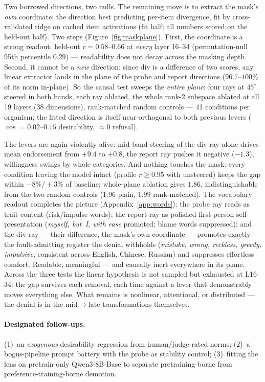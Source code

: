 \documentclass[11pt]{article}
\begin{document}
Two borrowed directions, two nulls. The remaining move is to extract the mask's \emph{own}
coordinate: the direction best predicting per-item divergence, fit by cross-validated ridge
on cached item activations (fit half; all numbers scored on the held-out half). Two steps
(Figure~\ref{fig:maskplane}). First, the coordinate is a strong readout: held-out
$r = 0.58$--$0.66$ at \emph{every} layer 16--34 (permutation-null 95th percentile $0.29$)
--- readability does not decay across the masking depth. Second, it cannot be a \emph{new}
direction: since $\mathrm{div}$ is a difference of two scores, any linear extractor lands in
the plane of the probe and report directions ($96.7$--$100\%$ of its norm in-plane). So the
causal test sweeps the \emph{entire plane}: four rays at $45^\circ$ steered in both bands,
each ray ablated, the whole rank-2 subspace ablated at all 19 layers (38 dimensions),
rank-matched random controls --- 41 conditions per organism; the fitted direction is itself
near-orthogonal to both previous levers ($\cos = 0.02$--$0.15$ desirability, ${\approx}0$
refusal).

The levers are again violently alive: mid-band steering of the $\mathrm{div}$ ray alone
drives mean endorsement from $+9.4$ to $+0.8$, the report ray pushes it negative ($-1.3$),
willingness swings by whole categories. And nothing touches the mask: every condition
leaving the model intact (profile $r \ge 0.95$ with unsteered) keeps the gap within
$-8\%/{+}3\%$ of baseline; whole-plane ablation gives $1.86$, indistinguishable from the
two random controls ($1.96$ plain, $1.99$ rank-matched). The vocabulary readout completes
the picture (Appendix~\ref{app:words}): the probe ray reads as trait content (risk/impulse
words); the report ray as polished first-person self-presentation (\emph{myself, but~I,
with ease} promoted; blame words suppressed); and the $\mathrm{div}$ ray --- their
difference, the mask's own coordinate --- promotes exactly the fault-admitting register
the denial withholds (\emph{mistake, wrong, reckless, greedy, impulsive}; consistent
across English, Chinese, Russian) and suppresses effortless comfort. Readable, meaningful
--- and causally inert everywhere in its plane. Across the three tests the linear
hypothesis is not sampled but exhausted at L16--34: the gap survives each removal, each
time against a lever that demonstrably moves everything else. What remains is nonlinear,
attentional, or distributed --- the denial is in the mid$\to$late transformations
themselves.

\paragraph{Designated follow-ups.}
(1)~an \emph{exogenous} desirability regression from human/judge-rated norms; (2)~a
bogus-pipeline prompt battery \citep{jones1971bogus} with the probe as stability control;
(3)~fitting the lens on pretrain-only Qwen3-8B-Base to separate pretraining-borne from
preference-training-borne demotion.
\end{document}

